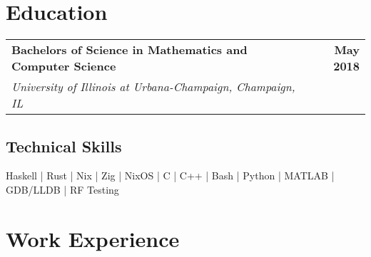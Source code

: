 \documentclass[letterpaper]{article}
\begin{document}
  \setcounter{secnumdepth}{0}

  \section{Education}

  \noindent
  \begin{tabularx}{\textwidth}{@{}X r@{}}
    \textbf{Bachelors of Science in Mathematics and Computer Science} & \textbf{May 2018} \\
    \textit{University of Illinois at Urbana-Champaign, Champaign, IL} &
  \end{tabularx}

  \subsection{Technical Skills}
   \noindent Haskell | Rust | Nix | Zig | NixOS | C | C++ | Bash | Python | MATLAB | GDB/LLDB | RF Testing

  \section{Work Experience}
\end{document}
